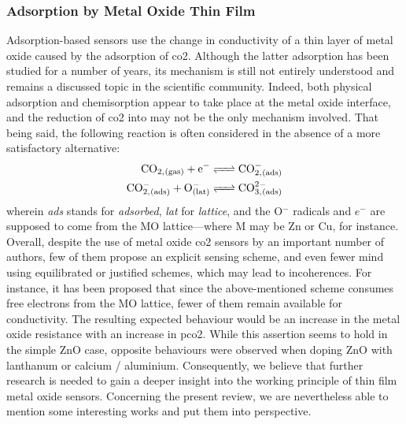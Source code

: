 \subsubsection{Adsorption by Metal Oxide Thin Film}\label{subsect:choos:review:metal_oxide}

Adsorption-based sensors use the change in conductivity of a thin layer of metal oxide caused by the adsorption of \gls{co2}. Although the latter adsorption has been studied for a number of years\cite{hotan1979, au1988, freund1996, seiferth1999, lopesmartins2004}, its mechanism is still not entirely understood and remains a discussed topic in the scientific community\cite{herran2009, noei2011, tang2013, usseinov2019}. Indeed, both physical adsorption and chemisorption appear to take place at the metal oxide interface, and the reduction of \gls{co2} into  may not be the only mechanism involved\cite{tang2013}. That being said, the following reaction is often considered in the absence of a more satisfactory alternative\cite{gankanda2016, colak2019, alvarez2020}:
\begin{equation}
	\begin{aligned}
		\ce{CO_{2,(gas)} + e^- &<=> CO^-_{2,(ads)}} \\
		\ce{CO^-_{2,(ads)} + O^-_{(lat)} &<=> CO^{2-}_{3,(ads)}}
	\end{aligned}
\end{equation}
wherein \emph{ads} stands for \emph{adsorbed}, \emph{lat} for \emph{lattice}, and the O$^-$ radicals and $e^-$ are supposed to come from the MO lattice---where M may be Zn or Cu, for instance. Overall, despite the use of metal oxide \gls{co2} sensors by an important number of authors, few of them propose an explicit sensing scheme, and even fewer mind using equilibrated or justified schemes, which may lead to incoherences. For instance, it has been proposed that since the above-mentioned scheme consumes free electrons from the MO lattice, fewer of them remain available for conductivity\cite{kannan2014}. The resulting expected behaviour would be an increase in the metal oxide resistance with an increase in \gls{pco2}. While this assertion seems to hold in the simple ZnO case\cite{haeusler1996, kannan2014, colak2019}, opposite behaviours were observed when doping ZnO with lanthanum\cite{jeong2016} or calcium / aluminium\cite{dhahri2017, ghosh2019}. Consequently, we believe that \mfrin{}further research is needed to gain a deeper insight into the working principle of thin film metal oxide sensors. Concerning the present review, we are nevertheless able to mention some interesting works and put them into perspective.

